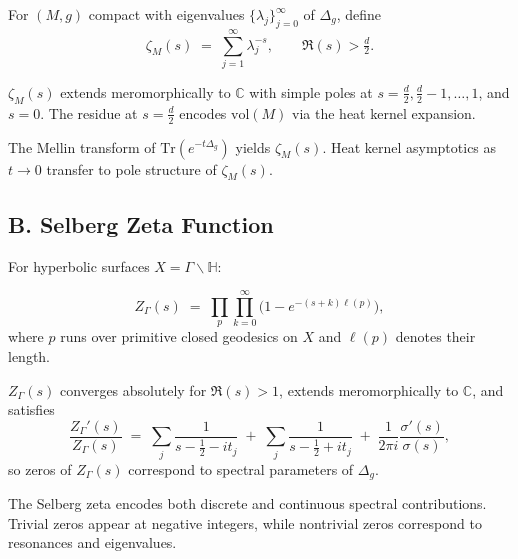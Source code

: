 \begin{definition}
For $(M,g)$ compact with eigenvalues $\{\lambda_j\}_{j=0}^\infty$ of $\Delta_g$, define
\[
  \zeta_M(s) \;=\; \sum_{j=1}^\infty \lambda_j^{-s}, \qquad \Re(s)>\tfrac{d}{2}.
\]
\end{definition}

\begin{theorem}
$\zeta_M(s)$ extends meromorphically to $\mathbb C$ with simple poles at $s=\tfrac{d}{2}, \tfrac{d}{2}-1, \ldots, 1$, and $s=0$.
The residue at $s=\tfrac{d}{2}$ encodes $\mathrm{vol}(M)$ via the heat kernel expansion.
\end{theorem}

\begin{remark}
The Mellin transform of $\mathrm{Tr}(e^{-t\Delta_g})$ yields $\zeta_M(s)$.
Heat kernel asymptotics as $t\to0$ transfer to pole structure of $\zeta_M(s)$.
\end{remark}

\subsection*{B. Selberg Zeta Function}
\label{subsec:selberg-zeta}

For hyperbolic surfaces $X=\Gamma\backslash\mathbb H$:

\begin{definition}
\[
  Z_\Gamma(s) \;=\; \prod_{p}\prod_{k=0}^\infty \Big(1 - e^{-(s+k)\ell(p)}\Big),
\]
where $p$ runs over primitive closed geodesics on $X$ and $\ell(p)$ denotes their length.
\end{definition}

\begin{theorem}
$Z_\Gamma(s)$ converges absolutely for $\Re(s)>1$, extends meromorphically to $\mathbb C$, and satisfies
\[
  \frac{Z_\Gamma'(s)}{Z_\Gamma(s)} \;=\; \sum_j \frac{1}{s-\tfrac12-it_j}
  \;+\; \sum_j \frac{1}{s-\tfrac12+it_j}
  \;+\; \frac{1}{2\pi i}\frac{\sigma'(s)}{\sigma(s)},
\]
so zeros of $Z_\Gamma(s)$ correspond to spectral parameters of $\Delta_g$.
\end{theorem}

\begin{remark}
The Selberg zeta encodes both discrete and continuous spectral contributions.
Trivial zeros appear at negative integers, while nontrivial zeros correspond to resonances and eigenvalues.
\end{remark}

